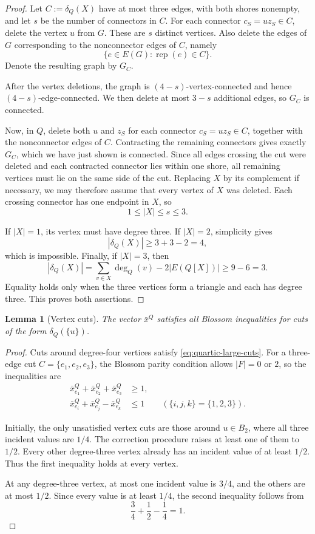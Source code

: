 \documentclass[11pt]{amsart}
\newcommand{\rep}[1]{\operatorname{rep}(#1)}
\newcommand{\1}{\mathbbm{1}}
\newtheorem{lemma}[theorem]{Lemma}
\begin{document}
\begin{proof}
Let $C:=\delta_Q(X)$ have at most three edges, with both
shores nonempty, and let $s$ be the number of connectors
in $C$. For each connector $c_S=uz_S\in C$, delete
the vertex $u$ from $G$. These are $s$ distinct vertices.
Also delete the edges of $G$ corresponding to the
nonconnector edges of $C$, namely
\[
 \{e\in E(G):\rep{e}\in C\}.
\]
Denote the resulting graph by $G_C$.

After the vertex deletions, the graph is
$(4-s)$-vertex-connected and hence
$(4-s)$-edge-connected. We then delete at most $3-s$
additional edges, so $G_C$ is connected.

Now, in $Q$, delete both $u$ and $z_S$ for each connector
$c_S=uz_S\in C$, together with the nonconnector edges
of $C$. Contracting the remaining connectors gives
exactly $G_C$, which we have just shown is connected.
Since all edges crossing the cut were deleted and each
contracted connector lies within one shore, all remaining
vertices must lie on the same side of the cut.
Replacing $X$ by its complement if necessary, we may
therefore assume that every vertex of $X$ was deleted.
Each crossing connector has one endpoint in $X$, so
\[
 1\le |X|\le s\le3.
\]

If $|X|=1$, its vertex must have degree three.
If $|X|=2$, simplicity gives
\[
 |\delta_Q(X)|\ge3+3-2=4,
\]
which is impossible. Finally, if $|X|=3$, then
\[
 |\delta_Q(X)|
 =\sum_{v\in X}\deg_Q(v)-2|E(Q[X])|
 \ge9-6=3.
\]
Equality holds only when the three vertices form a
triangle and each has degree three.
This proves both assertions.
\end{proof}

\begin{lemma}[Vertex cuts]
\label{lem:quartic-vertex-cuts}
The vector $\bar x^Q$ satisfies all Blossom inequalities for
cuts of the form $\delta_Q(\{u\})$.
\end{lemma}

\begin{proof}
Cuts around degree-four vertices satisfy
\eqref{eq:quartic-large-cuts}.
For a three-edge cut $C=\{e_1,e_2,e_3\}$, the Blossom
parity condition allows $|F|=0$ or $2$, so the inequalities are
\begin{equation}
\label{eq:quartic-three-cut-test}
 \begin{aligned}
 \bar x^Q_{e_1}+\bar x^Q_{e_2}+\bar x^Q_{e_3}&\ge1,\\
 \bar x^Q_{e_i}+\bar x^Q_{e_j}-\bar x^Q_{e_k}&\le1
 \qquad(\{i,j,k\}=\{1,2,3\}).
 \end{aligned}
\end{equation}

Initially, the only unsatisfied vertex cuts are those
around $u\in B_2$, where all three incident values are
$1/4$. The correction procedure raises at least one of
them to $1/2$. Every other degree-three vertex already
has an incident value of at least $1/2$.
Thus the first inequality holds at every vertex.

At any degree-three vertex, at most one incident value
is $3/4$, and the others are at most $1/2$.
Since every value is at least $1/4$, the second inequality
follows from
\[
 \frac34+\frac12-\frac14=1.
\]
\end{proof}
\end{document}
